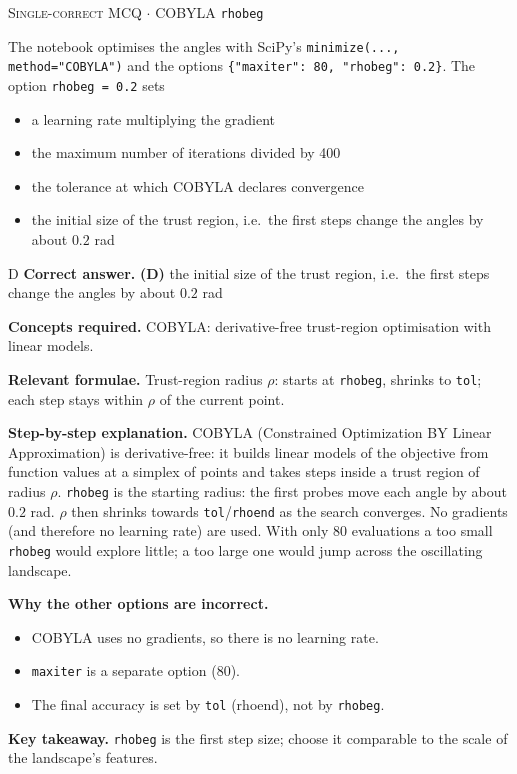 \documentclass[11pt,a4paper]{article}
\newcommand{\optlabel}[1]{\textbf{(#1)}}
\newcommand{\correctlabel}[1]{\textcolor{okgreen}{\textbf{(#1)}\,\ding{51}}}
\newenvironment{qitem}[1]{\begin{list}{}{\setlength{\leftmargin}{3.3em}\setlength{\labelwidth}{3.1em}%
  \setlength{\labelsep}{0.2em}\setlength{\topsep}{3pt}\setlength{\parsep}{3pt}}\item[\textbf{Q.#1}\hfill]}{\end{list}}
\newcommand{\qsep}{\par\vspace{2pt}{\color{black!15}\hrule}\vspace{4pt}}
\newcommand{\qmeta}[2]{{\footnotesize\color{black!60}\textsc{#1} \;$\cdot$\; #2}\par}
\begin{document}
\begin{qitem}{64}
\qmeta{Single-correct MCQ}{COBYLA \texttt{rhobeg}}
The notebook optimises the angles with SciPy's \texttt{minimize(..., method="COBYLA")} and the options
\texttt{\{"maxiter": 80, "rhobeg": 0.2\}}. The option \texttt{rhobeg = 0.2} sets
\begin{itemize}[leftmargin=2.6em, labelsep=0.4em, itemsep=2pt, topsep=3pt]
\item[\optlabel{A}] a learning rate multiplying the gradient
\item[\optlabel{B}] the maximum number of iterations divided by 400
\item[\optlabel{C}] the tolerance at which COBYLA declares convergence
\item[\correctlabel{D}] the initial size of the trust region, i.e.\ the first steps change the angles by about $0.2$ rad
\end{itemize}
\end{qitem}
\begin{solbox}{D}
\textbf{\color{brand}Correct answer.} \textcolor{okgreen}{\textbf{(D)}} the initial size of the trust region, i.e.\ the first steps change the angles by about $0.2$ rad

\textbf{\color{brand}Concepts required.} COBYLA: derivative-free trust-region optimisation with linear models.

\textbf{\color{brand}Relevant formulae.} Trust-region radius $\rho$: starts at \texttt{rhobeg}, shrinks to \texttt{tol}; each step stays within $\rho$ of the current point.

\textbf{\color{brand}Step-by-step explanation.} COBYLA (Constrained Optimization BY Linear Approximation) is derivative-free: it builds linear models of the objective
from function values at a simplex of points and takes steps inside a trust region of radius $\rho$. \texttt{rhobeg} is the
starting radius: the first probes move each angle by about $0.2$ rad. $\rho$ then shrinks towards \texttt{tol}/\texttt{rhoend} as the
search converges. No gradients (and therefore no learning rate) are used. With only 80 evaluations a too small \texttt{rhobeg}
would explore little; a too large one would jump across the oscillating landscape.

\textbf{\color{brand}Why the other options are incorrect.}
\begin{itemize}[leftmargin=2.4em, itemsep=1pt, topsep=2pt]
\item[\textbf{(A)}] COBYLA uses no gradients, so there is no learning rate.
\item[\textbf{(B)}] \texttt{maxiter} is a separate option ($80$).
\item[\textbf{(C)}] The final accuracy is set by \texttt{tol} (rhoend), not by \texttt{rhobeg}.
\end{itemize}
\textbf{\color{brand}Key takeaway.} \texttt{rhobeg} is the first step size; choose it comparable to the scale of the landscape's features.
\end{solbox}
\qsep
\end{document}
